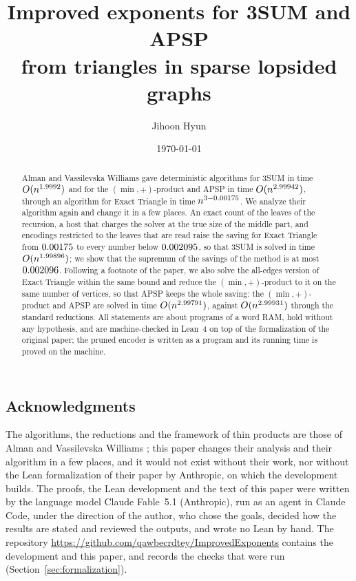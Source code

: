 \documentclass[11pt,reqno]{amsart}
\title[Improved exponents for 3SUM and APSP]{Improved exponents for 3SUM and
APSP\\ from triangles in sparse lopsided graphs}
\author{Jihoon Hyun}
\date{\today}
\begin{document}
\begin{abstract}
Alman and Vassilevska Williams gave deterministic algorithms for 3SUM in time
\(O(n^{1.9992})\) and for the \((\min,+)\)-product and APSP in
time \(O(n^{2.99942})\), through an algorithm for Exact Triangle in time
\(n^{3-0.00175}\).  We analyze their algorithm again and change it in a few
places.  An exact count of the leaves of the recursion, a host that charges the
solver at the true size of the middle part, and encodings restricted to the
leaves that are read raise the saving for Exact Triangle from \(0.00175\) to
every number below \(0.002095\), so that 3SUM is solved in time
\(O(n^{1.99896})\); we show that the supremum of the savings of the method
is at most \(0.002096\).  Following a footnote of the paper, we also solve the
all-edges version of Exact Triangle within the same bound and reduce the
\((\min,+)\)-product to it on the same number of vertices, so that APSP keeps
the whole saving: the \((\min,+)\)-product and APSP are solved in time
\(O(n^{2.99791})\), against \(O(n^{2.99931})\) through the standard
reductions.  All statements are about programs of a word RAM, hold without any
hypothesis, and are machine-checked in Lean~4 on top of the formalization of
the original paper; the pruned encoder is written as a program and its running
time is proved on the machine.
\end{abstract}

\maketitle

\setcounter{tocdepth}{1}
\tableofcontents











\subsection*{Acknowledgments}

The algorithms, the reductions and the framework of thin products are those
of Alman and Vassilevska Williams \cite{AV}; this paper changes their analysis
and their algorithm in a few places, and it would not exist without their work,
nor without the Lean formalization \cite{upstream} of their paper by Anthropic,
on which the development builds.  The proofs, the Lean development and the
text of this paper were written by the language model Claude Fable~5.1
(Anthropic), run as an agent in Claude Code, under the direction of the author,
who chose the goals, decided how the results are stated and reviewed the
outputs, and wrote no Lean by hand.  The repository
\url{https://github.com/qawbecrdtey/ImprovedExponents} contains the development
and this paper, and records the checks that were run
(Section~\ref{sec:formalization}).



\end{document}
